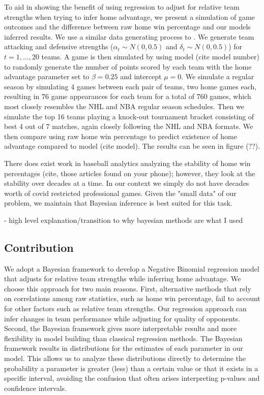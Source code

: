 To aid in showing the benefit of using regression to adjust for relative team strengths when trying to infer home advantage, we present a simulation of game outcomes and the difference between raw home win percentage and our models inferred results. We use a similar data generating process to \cite{Benz2020}. We generate team attacking and defensive strengths (\(\alpha_t \sim N(0, 0.5)\) and \(\delta_t \sim N(0, 0.5)\)) for \(t=1,...,20\) teams. A game is then simulated by using model (cite model number) to randomly generate the number of points scored by each team with the home advantage parameter set to \(\beta = 0.25\) and intercept \(\mu = 0\). We simulate a regular season by simulating 4 games between each pair of teams, two home games each, resulting in \(76\) game appearances for each team for a total of \(760\) games, which most closely resembles the NHL and NBA  regular season schedules. Then we simulate the top 16 teams playing a knock-out tournament bracket consisting of best 4 out of 7 matches, again closely following the NHL and NBA formats. We then compare using raw home win percentage to predict existence of home advantage compared to model (cite model). The results can be seen in figure (??).

There does exist work in baseball analytics analyzing the stability of home win percentages (cite, those articles found on your phone); however, they look at the stability over decades at a time. In our context we simply do not have decades worth of covid restricted professional games. Given the "small data" of our problem, we maintain that Bayesian inference is best suited for this task.


- high level explanation/transition to why bayesian methods are what I used

\subsection{Contribution}

We adopt a Bayesian framework to develop a Negative Binomial regression model that adjusts for relative team strengths while inferring home advantage. We choose this approach for two main reasons. First, alternative methods that rely on correlations among raw statistics, such as home win percentage, fail to account for other factors such as relative team strengths. Our regression approach can infer changes in team performance while adjusting for quality of opponents. Second, the Bayesian framework gives more interpretable results and more flexibility in model building than classical regression methods. The Bayesian framework results in distributions for the estimates of each parameter in our model. This allows us to analyze these distributions directly to determine the probability a parameter is greater (less) than a certain value or that it exists in a specific interval, avoiding the confusion that often arises interpreting p-values and confidence intervals.

